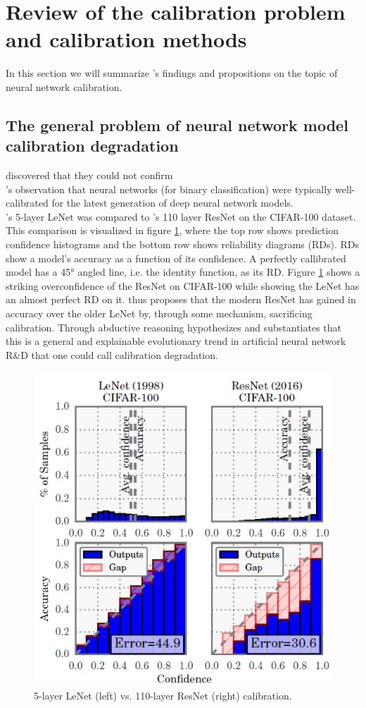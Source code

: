 \section{Review of the calibration problem and calibration methods}
In this section we will summarize \cite{guo2017calibration}'s findings and propositions on the topic of neural network calibration.

\subsection{The general problem of neural network model calibration degradation}
\cite{guo2017calibration} discovered that they could not confirm \\ \cite{niculescu2005predicting}'s observation that neural networks (for binary classification) were typically well-calibrated for the latest generation of deep neural network models. \\ \cite{lecun1998gradient}'s 5-layer LeNet was compared to \cite{he2016deep}'s 110 layer ResNet on the CIFAR-100 dataset. This comparison is visualized in figure \ref{fig:lenet_vs_resnet_calibration_guo_et_al}, where the top row shows prediction confidence histograms and the bottom row shows reliability diagrams (RDs). RDs show a model's accuracy as a function of its confidence. A perfectly callibrated model has a 45° angled line, i.e. the identity function, as its RD. Figure \ref{fig:lenet_vs_resnet_calibration_guo_et_al} shows a striking overconfidence of the ResNet on CIFAR-100 while showing the LeNet has an almost perfect RD on it. \cite{guo2017calibration} thus proposes that the modern ResNet has gained in accuracy over the older LeNet by, through some mechanism, sacrificing calibration. Through abductive reasoning \cite{guo2017calibration} hypothesizes and substantiates that this is a general and explainable evolutionary trend in artificial neural network R\&D that one could call calibration degradation. 

\begin{figure}[htbp!]
  \centering
  \includegraphics[width=0.6\linewidth]{images/lenet_vs_resnet_calibration_guo_et_al.jpg}
  \caption[5-layer LeNet's vs. 110-layer ResNet's calibration.]{5-layer LeNet (left) vs. 110-layer ResNet (right) calibration.}
  \label{fig:lenet_vs_resnet_calibration_guo_et_al}
\end{figure}
\newpage

